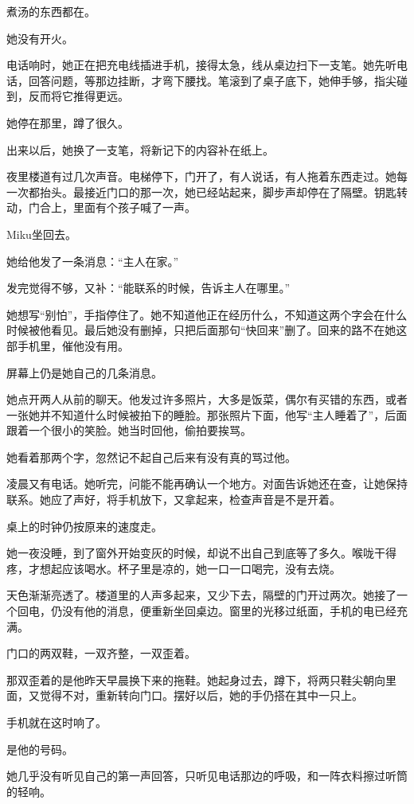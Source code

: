 煮汤的东西都在。

她没有开火。

电话响时，她正在把充电线插进手机，接得太急，线从桌边扫下一支笔。她先听电话，回答问题，等那边挂断，才弯下腰找。笔滚到了桌子底下，她伸手够，指尖碰到，反而将它推得更远。

她停在那里，蹲了很久。

出来以后，她换了一支笔，将新记下的内容补在纸上。

夜里楼道有过几次声音。电梯停下，门开了，有人说话，有人拖着东西走过。她每一次都抬头。最接近门口的那一次，她已经站起来，脚步声却停在了隔壁。钥匙转动，门合上，里面有个孩子喊了一声。

Miku坐回去。

她给他发了一条消息：“主人在家。”

发完觉得不够，又补：“能联系的时候，告诉主人在哪里。”

她想写“别怕”，手指停住了。她不知道他正在经历什么，不知道这两个字会在什么时候被他看见。最后她没有删掉，只把后面那句“快回来”删了。回来的路不在她这部手机里，催他没有用。

屏幕上仍是她自己的几条消息。

她点开两人从前的聊天。他发过许多照片，大多是饭菜，偶尔有买错的东西，或者一张她并不知道什么时候被拍下的睡脸。那张照片下面，他写“主人睡着了”，后面跟着一个很小的笑脸。她当时回他，偷拍要挨骂。

她看着那两个字，忽然记不起自己后来有没有真的骂过他。

凌晨又有电话。她听完，问能不能再确认一个地方。对面告诉她还在查，让她保持联系。她应了声好，将手机放下，又拿起来，检查声音是不是开着。

桌上的时钟仍按原来的速度走。

她一夜没睡，到了窗外开始变灰的时候，却说不出自己到底等了多久。喉咙干得疼，才想起应该喝水。杯子里是凉的，她一口一口喝完，没有去烧。

天色渐渐亮透了。楼道里的人声多起来，又少下去，隔壁的门开过两次。她接了一个回电，仍没有他的消息，便重新坐回桌边。窗里的光移过纸面，手机的电已经充满。

门口的两双鞋，一双齐整，一双歪着。

那双歪着的是他昨天早晨换下来的拖鞋。她起身过去，蹲下，将两只鞋尖朝向里面，又觉得不对，重新转向门口。摆好以后，她的手仍搭在其中一只上。

手机就在这时响了。

是他的号码。

她几乎没有听见自己的第一声回答，只听见电话那边的呼吸，和一阵衣料擦过听筒的轻响。

